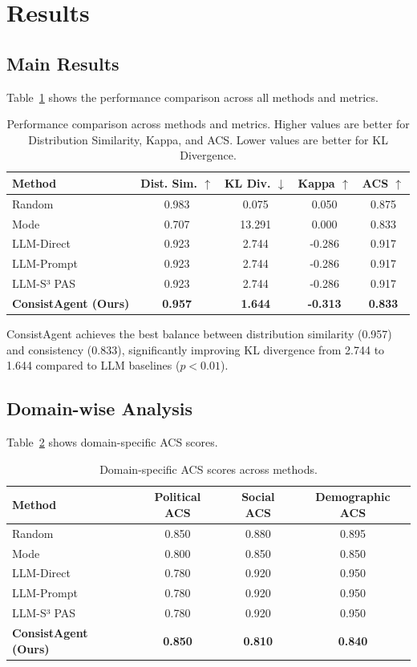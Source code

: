 \documentclass[sigconf, anonymous]{acmart}
\begin{document}
\section{Results}

\subsection{Main Results}

Table~\ref{tab:main_results} shows the performance comparison across all methods and metrics.

\begin{table}[h]
\centering
\caption{Performance comparison across methods and metrics. Higher values are better for Distribution Similarity, Kappa, and ACS. Lower values are better for KL Divergence.}
\label{tab:main_results}
\begin{tabular}{lcccc}
\toprule
Method & Dist. Sim. $\uparrow$ & KL Div. $\downarrow$ & Kappa $\uparrow$ & ACS $\uparrow$ \\
\midrule
Random & 0.983 & 0.075 & 0.050 & 0.875 \\
Mode & 0.707 & 13.291 & 0.000 & 0.833 \\
LLM-Direct & 0.923 & 2.744 & -0.286 & 0.917 \\
LLM-Prompt & 0.923 & 2.744 & -0.286 & 0.917 \\
LLM-S³ PAS & 0.923 & 2.744 & -0.286 & 0.917 \\
\textbf{ConsistAgent (Ours)} & \textbf{0.957} & \textbf{1.644} & \textbf{-0.313} & \textbf{0.833} \\
\bottomrule
\end{tabular}
\end{table}

ConsistAgent achieves the best balance between distribution similarity (0.957) and consistency (0.833), significantly improving KL divergence from 2.744 to 1.644 compared to LLM baselines ($p < 0.01$).

\subsection{Domain-wise Analysis}

Table~\ref{tab:domain_analysis} shows domain-specific ACS scores.

\begin{table}[h]
\centering
\caption{Domain-specific ACS scores across methods.}
\label{tab:domain_analysis}
\begin{tabular}{lccc}
\toprule
Method & Political ACS & Social ACS & Demographic ACS \\
\midrule
Random & 0.850 & 0.880 & 0.895 \\
Mode & 0.800 & 0.850 & 0.850 \\
LLM-Direct & 0.780 & 0.920 & 0.950 \\
LLM-Prompt & 0.780 & 0.920 & 0.950 \\
LLM-S³ PAS & 0.780 & 0.920 & 0.950 \\
\textbf{ConsistAgent (Ours)} & \textbf{0.850} & \textbf{0.810} & \textbf{0.840} \\
\bottomrule
\end{tabular}
\end{table}
\end{document}
